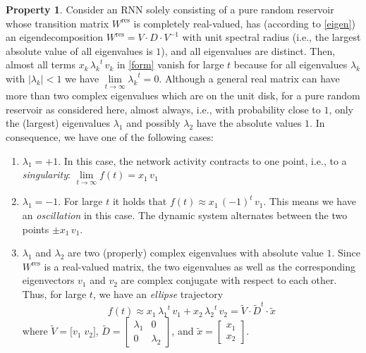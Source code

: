 \documentclass[twoside,11pt]{article}
\theoremstyle{definition}
\newtheorem{prop}{Property}
\begin{document}
\begin{prop}\label{infty}
Consider an RNN solely consisting of a pure random reservoir whose transition
matrix $W^\mathrm{res}$ is completely real-valued, has (according to
\cref{eigen}) an eigendecomposition $W^\mathrm{res} = V \cdot D \cdot
V^{-1}$ with unit spectral radius (i.e., the largest absolute value of all
eigenvalues is $1$), and all eigenvalues are distinct. Then, almost all terms $x_k\,{\lambda_k}^t\,v_k$ in
\cref{form} vanish for large $t$ because for all eigenvalues $\lambda_k$
with $|\lambda_k| < 1$ we have $\lim\limits_{t \to \infty} {\lambda_k}^t = 0$.
Although a general real matrix can have more than two complex eigenvalues which
are on the unit disk, for a pure random reservoir as considered here, almost
always, i.e., with probability close to $1$, only the (largest) eigenvalues $\lambda_1$ and possibly
$\lambda_2$ have the absolute values $1$. In consequence, we have one of the
following cases:
\begin{enumerate}
  \item $\lambda_1 = +1$. In this case, the network activity contracts to one
	point, i.e., to a \emph{singularity}: $\lim\limits_{t \to \infty}
	f(t) = x_1\,v_1$
  \item $\lambda_1 = -1$. For large $t$ it holds that $f(t) \approx
	x_1\,(-1)^t\,v_1$. This means we have an \emph{oscillation} in this
	case. The dynamic system alternates between the two points $\pm x_1\,v_1$.
  \item $\lambda_1$ and $\lambda_2$ are two (properly) complex eigenvalues with
	absolute value $1$. Since $W^\mathrm{res}$ is a real-valued matrix, the two
	eigenvalues as well as the corresponding eigenvectors $v_1$ and $v_2$
	are complex conjugate with respect to each other. Thus, for large $t$, we
	have an \emph{ellipse} trajectory
	\[
		f(t) \approx x_1\,{\lambda_1}^t\,v_1 + x_2\,{\lambda_2}^t\,v_2
		= \tilde{V} \cdot \tilde{D}^t \cdot \tilde{x}
	\]
	where $\tilde{V} = \big[ v_1\;v_2 \big]$, $\tilde{D} = \left[
	\begin{array}{cc} \lambda_1 & 0 \\ 0 & \lambda_2 \end{array} \right]$,
	and $\tilde{x} = \left[ \begin{array}{c} x_1 \\ x_2 \end{array}
	\right]$.
\end{enumerate}
\end{prop}
\end{document}
